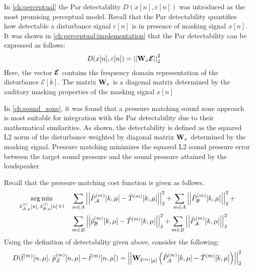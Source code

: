 In \autoref{ch:perceptual} the Par detectability $D(x[n],\varepsilon[n])$ was introduced as the most promising perceptual model.
Recall that the Par detectability quantifies how detectable a disturbance signal $\varepsilon[n]$ is in presence of masking signal $x[n]$.
It was shown in \autoref{ch:perceptual:implementation} that the Par detectability can be expressed as follows: 
\begin{align}
    D(x[n],\varepsilon[n]) &= \norm[2][2]{\mat{W}_{x}\vecsymbol{\mathcal{E}}} 
\end{align}
Here, the vector $\boldsymbol{\mathcal{E}}$ contains the frequency domain representation of the disturbance $\mathcal{E}[k]$.
The matrix $\mathbf{W}_{x}$ is a diagonal matrix determined by the auditory masking properties of the masking signal $x[n]$ 

In \autoref{ch:sound_zone}, it was found that a pressure matching sound zone approach is most suitable for integration with the Par detectability
due to their mathematical similarities.
As shown, the detectability is defined as the squared L2 norm of the disturbance weighted by diagonal matrix $\mathbf{W}_{x}$ determined by the masking signal.
Pressure matching minimizes the squared L2 sound pressure error between the target sound pressure and the sound pressure attained by the loudspeaker.

Recall that the pressure matching cost function is given as follows.
\begin{align}
    \argmin{\tilde{x}_{\za,\mu}^{(l)}[n],\,\tilde{x}_{\zb,\mu}^{(l)}[n]\,\forall\,l}{
       &\sum_{m\in A} \norm[2][2]{\tilde{P}_{\za}^{(m)}[k,\mu] - \tilde{T}^{(m)}[k,\mu]} +
        \sum_{m\in A} \norm[2][2]{\tilde{P}_{\zb}^{(m)}[k,\mu]} + \\
       &\sum_{m\in B} \norm[2][2]{\tilde{p}_{\zb}^{(m)}[k,\mu] - \tilde{T}^{(m)}[k,\mu]} + 
        \sum_{m\in B} \norm[2][2]{\tilde{P}_{\za}^{(m)}[k,\mu]}
    }
\end{align}
Using the definition of detectability given above, consider the following:
\begin{equation}
    D(\tilde{t}^{(m)}[n,\mu],\,\tilde{p}_{\zz}^{(m)}[n,\mu] - \tilde{t}^{(m)}[n,\mu]) = 
        \norm[2][2]{\mat{W}_{\tilde{t}^{(m)}[\mu]}\left(\tilde{P}_{\za}^{(m)}[k,\mu] - \tilde{T}^{(m)}[k,\mu]\right)} 
\end{equation}



